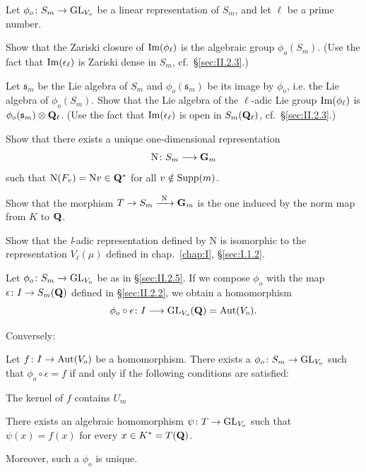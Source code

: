 \begin{exercises}
\begin{nlist}
\item Let $\phi_o\colon S_m \to \mathrm{GL}_{V_o}$ be a linear representation
of $S_m$, and let $\ell$ be a prime number.
\begin{alist}[label=\alph*)]
\item Show that the Zariski closure of $\mathrm{Im}(\phi_\ell)$ is the
algebraic group $\phi_o(S_m)$.  (Use the fact that
$\mathrm{Im}(\epsilon_\ell)$ is Zariski dense in $S_m$,
cf.~\S\ref{sec:II.2.3}.)
\item Let $\mathfrak{s}_m$ be the Lie algebra of $S_m$ and
$\phi_o(\mathfrak{s}_m)$ be its image by $\phi_o$, i.e.  the Lie algebra
of $\phi_o(S_m)$.  Show that the Lie algebra of the $\ell$-adic Lie
group $\mathrm{Im}(\phi_\ell)$ is $\phi_o(\mathfrak{s}_m) \mathbin{\otimes} \mathbf{Q}_\ell$.
(Use the fact that $\mathrm{Im}(\epsilon_\ell)$ is open in $S_m(\mathbf{Q}_\ell)$,
cf.~\S\ref{sec:II.2.3}.)
\end{alist}

\item \begin{alist}[label=\alph*)]
\item Show that there exists a unique one-dimensional representation
\[
\mathrm{N}\colon S_m \longrightarrow \mathbf{G}_m
\]
such that $\mathrm{N}(F_v) = \mathrm{N}v \in \mathbf{Q}^*$ for all
$v \notin \mathrm{Supp}(m)$.
\item Show that the morphism
$T \to S_m \xrightarrow{\ \mathrm{N}\ } \mathbf{G}_m$ is the one induced by the
norm map from $K$ to $\mathbf{Q}$.
\item Show that the \textit{l}-adic representation defined by
$\mathrm{N}$ is isomorphic to the representation $V_\ell(\mu)$ defined
in chap.~\ref{chap:I}, \S\ref{sec:I.1.2}.
\end{alist}
\end{nlist}
\end{exercises}


Let $\phi_o\colon S_m \to \mathrm{GL}_{V_o}$ be as in \S\ref{sec:II.2.5}.  If we
compose $\phi_o$ with the map $\epsilon\colon I \to S_m(\mathbf{Q})$ defined in
\S\ref{sec:II.2.2}, we obtain a homomorphism
\[
\phi_o \circ \epsilon\colon I \longrightarrow \mathrm{GL}_{V_o}(\mathbf{Q})
= \mathrm{Aut}(V_o).
\]

Conversely:

\begin{proposition}
Let $f\colon I \to \mathrm{Aut}(V_o)$ be a homomorphism.  There exists a
$\phi_o\colon S_m \to \mathrm{GL}_{V_o}$ such that $\phi_o \circ \epsilon = f$
if and only if the following conditions are satisfied:
\begin{alist}
\item The kernel of $f$ contains $U_m$
\item There exists an algebraic homomorphism
$\psi\colon T \to \mathrm{GL}_{V_o}$ such that $\psi(x) = f(x)$ for every
$x \in K^* = T(\mathbf{Q})$.
\end{alist}
Moreover, such a $\phi_o$ is unique.
\end{proposition}

